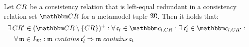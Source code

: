 
\begin{lemma} \label{lemma:leftequalredundancysubset}
    Let $\consistencyrelation{CR}{}$ be a consistency relation that is left-equal redundant in a consistency relation set $\consistencyrelationset{CR}$ for a metamodel tuple $\metamodeltuple{M}$. Then it holds that: 
    \begin{align*}
        &
        \exists \consistencyrelation{CR}{}' \in \transitiveclosure{(\consistencyrelationset{CR} \setminus \setted{\consistencyrelation{CR}{}})} : 
        \forall \conditionelement{c}{l} \in \condition{c}{l, \consistencyrelation{CR}{}} : 
        \exists \conditionelement{c}{l}' \in \condition{c}{l,\consistencyrelation{CR}{}'} : \\
        & \formulaskip
        \forall \modeltuple{m} \in \metamodeltupleinstanceset{M} : 
        \modeltuple{m} \containsmath \conditionelement{c}{l}' \Rightarrow 
        \modeltuple{m} \containsmath \conditionelement{c}{l}
    \end{align*}
\end{lemma}
%
